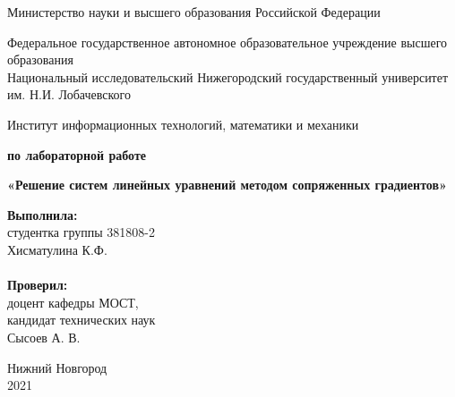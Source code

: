\documentclass{report}
\begin{document}
 \begin{titlepage}

 \begin{center}
 Министерство науки и высшего образования Российской Федерации
 \end{center}

 \begin{center}
 Федеральное государственное автономное образовательное учреждение высшего образования \\
 Национальный исследовательский Нижегородский государственный университет им. Н.И. Лобачевского
 \end{center}

 \begin{center}
 Институт информационных технологий, математики и механики
 \end{center}

 \vspace{4em}

 \begin{center}
 \textbf{ по лабораторной работе} \\
 \end{center}
 \begin{center}
 \textbf{\Large«Решение систем линейных уравнений методом сопряженных градиентов»} \\
 \end{center}

 \vspace{4em}

 \newbox{\lbox}
 \newlength{\maxl}
 \setlength{\maxl}{\wd\lbox}
 \hfill\parbox{7cm}{
 \hspace*{5cm}\hspace*{-5cm}\textbf{Выполнила:} \\ студентка группы 381808-2 \\ Хисматулина К.Ф. \\
 \\
 \hspace*{5cm}\hspace*{-5cm}\textbf{Проверил:}\\ доцент кафедры МОСТ, \\ кандидат технических наук \\ Сысоев А. В. \\
 }
 \vspace{\fill}

 \begin{center} Нижний Новгород \\ 2021 \end{center}

 \end{titlepage}
\end{document}
